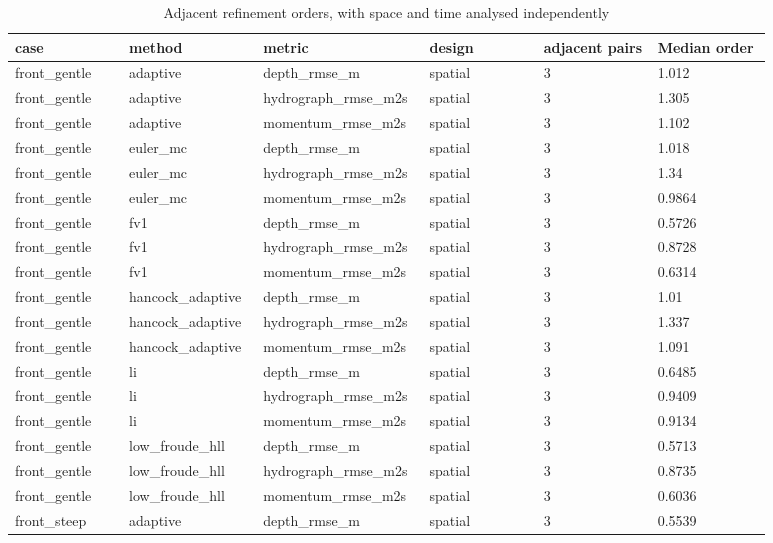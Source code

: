 \begingroup
\small
\setlength{\tabcolsep}{2pt}
\begin{longtable}{p{0.1467\linewidth}p{0.1467\linewidth}p{0.1467\linewidth}p{0.1467\linewidth}p{0.1467\linewidth}p{0.1467\linewidth}}
\caption{Adjacent refinement orders, with space and time analysed independently}\\
\hline
case & method & metric & design & adjacent pairs & Median order \\
\hline\endhead
front\_gentle & adaptive & depth\_rmse\_m & spatial & 3 & 1.012 \\
front\_gentle & adaptive & hydrograph\_rmse\_m2s & spatial & 3 & 1.305 \\
front\_gentle & adaptive & momentum\_rmse\_m2s & spatial & 3 & 1.102 \\
front\_gentle & euler\_mc & depth\_rmse\_m & spatial & 3 & 1.018 \\
front\_gentle & euler\_mc & hydrograph\_rmse\_m2s & spatial & 3 & 1.34 \\
front\_gentle & euler\_mc & momentum\_rmse\_m2s & spatial & 3 & 0.9864 \\
front\_gentle & fv1 & depth\_rmse\_m & spatial & 3 & 0.5726 \\
front\_gentle & fv1 & hydrograph\_rmse\_m2s & spatial & 3 & 0.8728 \\
front\_gentle & fv1 & momentum\_rmse\_m2s & spatial & 3 & 0.6314 \\
front\_gentle & hancock\_adaptive & depth\_rmse\_m & spatial & 3 & 1.01 \\
front\_gentle & hancock\_adaptive & hydrograph\_rmse\_m2s & spatial & 3 & 1.337 \\
front\_gentle & hancock\_adaptive & momentum\_rmse\_m2s & spatial & 3 & 1.091 \\
front\_gentle & li & depth\_rmse\_m & spatial & 3 & 0.6485 \\
front\_gentle & li & hydrograph\_rmse\_m2s & spatial & 3 & 0.9409 \\
front\_gentle & li & momentum\_rmse\_m2s & spatial & 3 & 0.9134 \\
front\_gentle & low\_froude\_hll & depth\_rmse\_m & spatial & 3 & 0.5713 \\
front\_gentle & low\_froude\_hll & hydrograph\_rmse\_m2s & spatial & 3 & 0.8735 \\
front\_gentle & low\_froude\_hll & momentum\_rmse\_m2s & spatial & 3 & 0.6036 \\
front\_steep & adaptive & depth\_rmse\_m & spatial & 3 & 0.5539 \\

\end{longtable}
